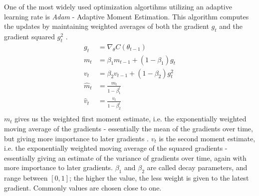 
One of the most widely used optimization algortihms utilizing an adaptive learning rate is \textit{Adam} - Adaptive Moment Estimation.
This algorithm computes the updates by maintaining weighted averages of both the gradient $g_t$ and the gradient squared $g_t^2$ \citep[p. 123]{Ketkar2017}. 
\begin{equation}\label{eq:updt_adam}
\begin{split}
    g_t &= \nabla_{\theta}C(\theta_{t-1})   \\
    m_t &= \beta_1m_{t-1} + (1-\beta_1)g_t \\
    v_t &= \beta_2v_{t-1} + (1-\beta_2)g_t^2 \\
    \hat{m}_t &= \frac{m_t}{1-\beta_1^t} \\
    \hat{v}_t &= \frac{v_t}{1-\beta_2^t} \\
\end{split}
\end{equation}
$m_t$ gives us the weighted first moment estimate, i.e. the exponentially weighted moving average of the gradients - essentially the mean of the gradients over time, but giving more importance to later gradients \cite{kingba}. $v_t$ is the second moment estimate, i.e. the exponentially weighted moving average of the squared gradients - essentially giving an estimate of the variance of gradients over time, again with more importance to later gradients. $\beta_1$ and $\beta_2$ are called decay parameters, and range between $[0,1]$; the higher the value, the less weight is given to the latest gradient. Commonly values are chosen close to one. 

